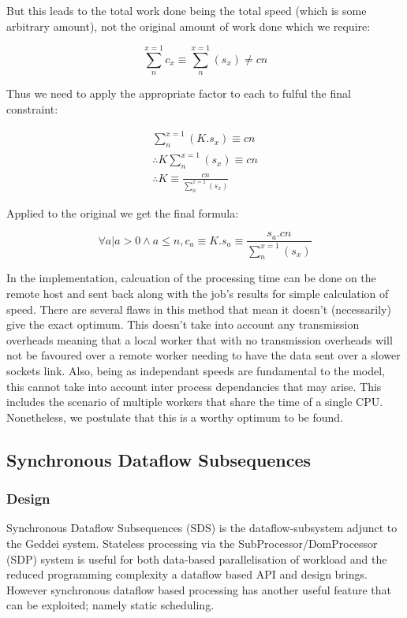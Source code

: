 But this leads to the total work done being the total speed (which is some arbitrary amount), not the original amount of work done which we require:

\begin{equation}
\sum^{x=1}_n c_x \equiv \sum^{x=1}_n(s_x) \ne cn
\end{equation}

Thus we need to apply the appropriate factor to each to fulful the final constraint:

\begin{eqnarray}
\sum^{x=1}_n(K.s_x) \equiv cn \\
\therefore K \sum^{x=1}_n(s_x) \equiv cn \\
\therefore K \equiv \frac{cn}{\sum^{x=1}_n(s_x)}
\end{eqnarray}

Applied to the original we get the final formula:

\begin{equation}
\forall a | a > 0 \wedge a \leq n, c_a \equiv K.s_a \equiv \frac{s_a.cn}{\sum^{x=1}_n(s_x)}
\end{equation}

In the implementation, calcuation of the processing time can be done on the remote host and sent back along with the job's results for simple calculation of speed. There are several flaws in this method that mean it doesn't (necessarily) give the exact optimum. This doesn't take into account any transmission overheads meaning that a local worker that with no transmission overheads will not be favoured over a remote worker needing to have the data sent over a slower sockets link. Also, being as independant speeds are fundamental to the model, this cannot take into account inter process dependancies that may arise. This includes the scenario of multiple workers that share the time of a single CPU. Nonetheless, we postulate that this is a worthy optimum to be found.

\subsection{Synchronous Dataflow Subsequences}\label{sec:combination}

\subsubsection{Design}

Synchronous Dataflow Subsequences (SDS) is the dataflow-subsystem adjunct to the Geddei system. Stateless processing via the SubProcessor/DomProcessor (SDP) system is useful for both data-based parallelisation of workload and the reduced programming complexity a dataflow based API and design brings. However synchronous dataflow based processing has another useful feature that can be exploited; namely static scheduling.

